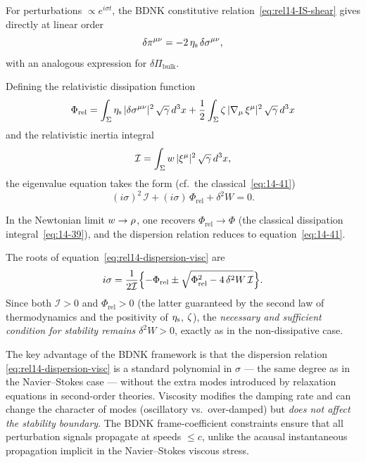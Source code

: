 For perturbations $\propto e^{i\sigma t}$, the BDNK constitutive
relation~\eqref{eq:rel14-IS-shear} gives directly at linear order
\begin{equation}
  \delta\pi^{\mu\nu}
  = -2\,\eta_{\mathrm{s}}\,\delta\sigma^{\mu\nu},
  \label{eq:rel14-deltaPI-shear}
\end{equation}
with an analogous expression for $\delta\Pi_{\mathrm{bulk}}$.

Defining the relativistic dissipation function
\begin{equation}
  \Phi_{\mathrm{rel}}
  = \int_{\Sigma}
    \eta_{\mathrm{s}}\,
    |\delta\sigma^{\mu\nu}|^{2}\,\sqrt{\gamma}\,d^{3}x
  + \frac{1}{2}\int_{\Sigma}
    \zeta\,
    |\nabla_{\mu}\,\xi^{\mu}|^{2}\,\sqrt{\gamma}\,d^{3}x
  \label{eq:rel14-Phi-rel}
\end{equation}
and the relativistic inertia integral
\begin{equation}
  \mathcal{I}
  = \int_{\Sigma}w\,|\xi^{\mu}|^{2}\,
    \sqrt{\gamma}\,d^{3}x,
  \label{eq:rel14-inertia}
\end{equation}
the eigenvalue equation takes the form (cf.\ the
classical~\eqref{eq:14-41})
\begin{equation}
  \boxed{
  (i\sigma)^{2}\,\mathcal{I}
  + (i\sigma)\,\Phi_{\mathrm{rel}}
  + \delta^{2}W = 0.}
  \label{eq:rel14-dispersion-visc}
\end{equation}

In the Newtonian limit $w \to \rho$, one recovers
$\Phi_{\mathrm{rel}}\to\Phi$ (the classical dissipation
integral~\eqref{eq:14-39}), and the dispersion relation reduces to
equation~\eqref{eq:14-41}.

The roots of equation~\eqref{eq:rel14-dispersion-visc} are
\begin{equation}
  i\sigma
  = \frac{1}{2\mathcal{I}}\Bigl\{
    -\Phi_{\mathrm{rel}}
    \pm \sqrt{\Phi_{\mathrm{rel}}^{2}
      - 4\,\delta^{2}W\,\mathcal{I}}
    \Bigr\}.
  \label{eq:rel14-sigma-roots}
\end{equation}
Since both $\mathcal{I}>0$ and $\Phi_{\mathrm{rel}}>0$ (the latter
guaranteed by the second law of thermodynamics and the positivity of
$\eta_{\mathrm{s}}$, $\zeta$), the \emph{necessary and sufficient
condition for stability remains $\delta^{2}W>0$}, exactly as in the
non-dissipative case.

The key advantage of the BDNK framework is that the dispersion relation
\eqref{eq:rel14-dispersion-visc} is a standard polynomial in $\sigma$
--- the same degree as in the Navier--Stokes case --- without the extra
modes introduced by relaxation equations in second-order theories.
Viscosity modifies the damping rate and can change the character of
modes (oscillatory vs.\ over-damped) but \emph{does not affect the
stability boundary}.  The BDNK frame-coefficient constraints ensure
that all perturbation signals propagate at speeds $\le c$, unlike the
acausal instantaneous propagation implicit in the Navier--Stokes
viscous stress.

